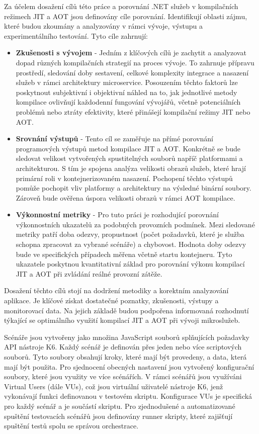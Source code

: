 
Za účelem dosažení cílů této práce a porovnání .NET služeb v kompilačních režimech JIT a AOT jsou definovány cíle porovnání. Identifikují oblasti zájmu, které budou zkoumány a analyzovány v rámci vývoje, výstupu a experimentálního testování. Tyto cíle zahrnují:  

\begin{itemize}
  \item \textbf{Zkušenosti s vývojem} - Jedním z klíčových cílů je zachytit a analyzovat dopad různých kompilačních strategií na proces vývoje. To zahrnuje přípravu prostředí, sledování doby sestavení, celkové komplexity integrace a nasazení služeb v rámci architektury microservice. Posouzením těchto faktorů lze poskytnout subjektivní i objektivní náhled na to, jak jednotlivé metody kompilace ovlivňují každodenní fungování vývojářů, včetně potenciálních problémů nebo ztráty efektivity, které přinášejí kompilační režimy JIT nebo AOT.
  \item \textbf{Srovnání výstupů} - Tento cíl se zaměřuje na přímé porovnání programových výstupů metod kompilace JIT a AOT. Konkrétně se bude sledovat velikost vytvořených spustitelných souborů napříč platformami a architekturou. S tím je spojena analýza velikosti obrazů služeb, které hrají primární roli v kontejnerizovaném nasazení. Pochopení těchto výstupů pomůže pochopit vliv platformy a architektury na výsledné binární soubory. Zároveň bude ověřena úspora velikosti obrazů v rámci AOT kompilace.
  \item \textbf{Výkonnostní metriky} - Pro tuto práci je rozhodující porovnání výkonnostních ukazatelů za podobných provozních podmínek. Mezi sledované metriky patří doba odezvy, propustnost (počet požadavků, které je služba schopna zpracovat za vybrané scénáře) a chybovost. Hodnota doby odezvy bude ve specifických případech měřena včetně startu kontejneru. Tyto ukazatele poskytnou kvantitativní základ pro porovnání výkonu kompilací JIT a AOT při zvládání reálné provozní zátěže.
\end{itemize}

Dosažení těchto cílů stojí na dodržení metodiky a korektním analyzování aplikace. Je klíčové získat dostatečné poznatky, zkušenosti, výstupy a monitorovací data. Na jejich základě budou podpořena informovaná rozhodnutí týkající se optimálního využití kompilací JIT a AOT při vývoji mikroslužeb.


Scénáře jsou vytvořeny jako množina JavaScript souborů splňujících požadavky API nástroje K6. Každý scénář je definován přes jeden nebo více scriptových souborů. Tyto soubory obsahují kroky, které mají být provedeny, a data, která mají být použita. Pro sjednocení obecných nastavení jsou vytvořený konfigurační soubory, které jsou využity ve více scénářích. V rámci scénářů jsou využíváni Virtual Users (dále VUs), což jsou virtuální uživatelé nástroje K6, jenž vykonávají funkci definovanou v testovém skriptu. Konfigurace VUs je specifická pro každý scénář a je součástí skriptu. Pro zjednodušené a automatizované spuštění testovacích scénářů jsou definovány runner skripty, které zajišťují spuštění testů spolu se správou orchestrace.

